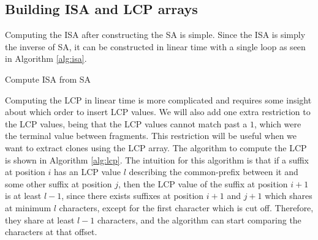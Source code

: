 \subsection*{Building ISA and LCP arrays}

Computing the ISA after constructing the SA is simple. Since the ISA is simply the inverse
of SA, it can be constructed in linear time with a single loop as seen in Algorithm
\ref{alg:isa}.

\begin{algorithm}[t]
  \SetAlgoLined\DontPrintSemicolon

  \vspace{0.5cm}
  \caption{Compute ISA from SA}
  \label{alg:isa}
\end{algorithm}


Computing the LCP in linear time is more complicated and requires some insight about which
order to insert LCP values. We will also add one extra restriction to the LCP values,
being that the LCP values cannot match past a $1$, which were the terminal value between
fragments. This restriction will be useful when we want to extract clones using the LCP
array. The algorithm to compute the LCP is shown in Algorithm \ref{alg:lcp}. The intuition
for this algorithm is that if a suffix at position $i$ has an LCP value $l$ describing the
common-prefix between it and some other suffix at position $j$, then the LCP value of the
suffix at position $i + 1$ is at least $l - 1$, since there exists suffixes at position $i
+ 1$ and $j + 1$ which shares at minimum $l$ characters, except for the first character
which is cut off. Therefore, they share at least $l - 1$ characters, and the algorithm can
start comparing the characters at that offset.

